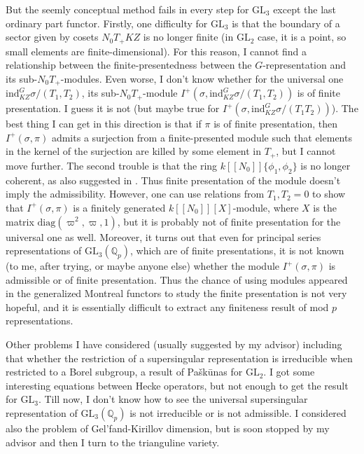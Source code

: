 \documentclass{amsart}
\newcommand{\Q}{\mathbb{Q}}
\newcommand{\GL}{\text{GL}}
\newcommand{\ind}{\text{ind}}
\numberwithin{equation}{section}
\begin{document}
But the seemly conceptual method fails in every step for $\GL_3$ except the last ordinary part functor. Firstly, one difficulty for $\GL_3$ is that the boundary of a sector given by cosets $N_0T_+KZ$ is no longer finite (in $\GL_2$ case, it is a point, so small elements are finite-dimensional). For this reason, I cannot find a relationship between the finite-presentedness between the $G$-representation and its sub-$N_0T_+$-modules. Even worse, I don't know whether for the universal one $\ind_{KZ}^G\sigma/(T_1,T_2)$, its sub-$N_0T_+$-module $I^+(\sigma, \ind_{KZ}^G\sigma/(T_1,T_2))$ is of finite presentation. I guess it is not (but maybe true for $I^+(\sigma, \ind_{KZ}^G\sigma/(T_1T_2))$). The best thing I can get in this direction is that if $\pi$ is of finite presentation, then $I^+(\sigma,\pi)$ admits a surjection from a finite-presented module such that elements in the kernel of the surjection are killed by some element in $T_+$, but I cannot move further. The second trouble is that the ring $k[[N_0]]\{\phi_1,\phi_2\}$ is no longer coherent, as also suggested in \cite{zabradi2018multivariable}. Thus finite presentation of the module doesn't imply the admissibility. However, one can use relations from $T_1,T_2=0$ to show that $I^+(\sigma,\pi)$ is a finitely generated $k[[N_0]][X]$-module, where $X$ is the matrix $\text{diag}(\varpi^2,\varpi,1)$, but it is probably not of finite presentation for the universal one as well. Moreover, it turns out that even for principal series representations of $\GL_3(\Q_p)$, which are of finite presentations, it is not known (to me, after trying, or maybe anyone else) whether the module $I^+(\sigma,\pi)$ is admissible or of finite presentation. Thus the chance of using modules appeared in the generalized Montreal functors to study the finite presentation is not very hopeful, and it is essentially difficult to extract any finiteness result of mod $p$ representations.\par
Other problems I have considered (usually suggested by my advisor) including that whether the restriction of a supersingular representation is irreducible when restricted to a Borel subgroup, a result of Pa{\v{s}}k{\=u}nas for $\GL_2$. I got some interesting equations between Hecke operators, but not enough to get the result for $\GL_3$. Till now, I don't know how to see the universal supersingular representation of $\GL_3(\Q_p)$ is not irreducible or is not admissible. I considered also the problem of Gel'fand-Kirillov dimension, but is soon stopped by my advisor and then I turn to the trianguline variety.
\end{document}
